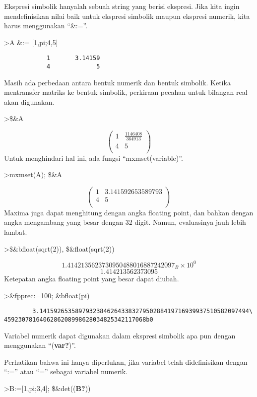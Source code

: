 \documentclass[
]{book}
\begin{document}
Ekspresi simbolik hanyalah sebuah string yang berisi ekspresi. Jika kita ingin mendefinisikan nilai baik untuk ekspresi simbolik maupun ekspresi numerik, kita harus menggunakan ``\&:=''.

\textgreater A \&:= {[}1,pi;4,5{]}

\begin{verbatim}
            1       3.14159 
            4             5 
\end{verbatim}

Masih ada perbedaan antara bentuk numerik dan bentuk simbolik. Ketika mentransfer matriks ke bentuk simbolik, perkiraan pecahan untuk bilangan real akan digunakan.

\textgreater\$\&A

\[\begin{pmatrix}1 & \frac{1146408}{364913} \\ 4 & 5 \\ \end{pmatrix}\]Untuk menghindari hal ini, ada fungsi ``mxmset(variable)''.

\textgreater mxmset(A); \$\&A

\[\begin{pmatrix}1 & 3.141592653589793 \\ 4 & 5 \\ \end{pmatrix}\]Maxima juga dapat menghitung dengan angka floating point, dan bahkan dengan angka mengambang yang besar dengan 32 digit. Namun, evaluasinya jauh lebih lambat.

\textgreater\$\&bfloat(sqrt(2)), \$\&float(sqrt(2))

\[1.4142135623730950488016887242097_B \times 10^{0}\]\[1.414213562373095\]Ketepatan angka floating point yang besar dapat diubah.

\textgreater\&fpprec:=100; \&bfloat(pi)

\begin{verbatim}
        3.14159265358979323846264338327950288419716939937510582097494\
4592307816406286208998628034825342117068b0
\end{verbatim}

Variabel numerik dapat digunakan dalam ekspresi simbolik apa pun dengan menggunakan ``(\textbf{var?})''.

Perhatikan bahwa ini hanya diperlukan, jika variabel telah didefinisikan dengan ``:='' atau ``='' sebagai variabel numerik.

\textgreater B:={[}1,pi;3,4{]}; \$\&det((\textbf{B?}))
\end{document}
